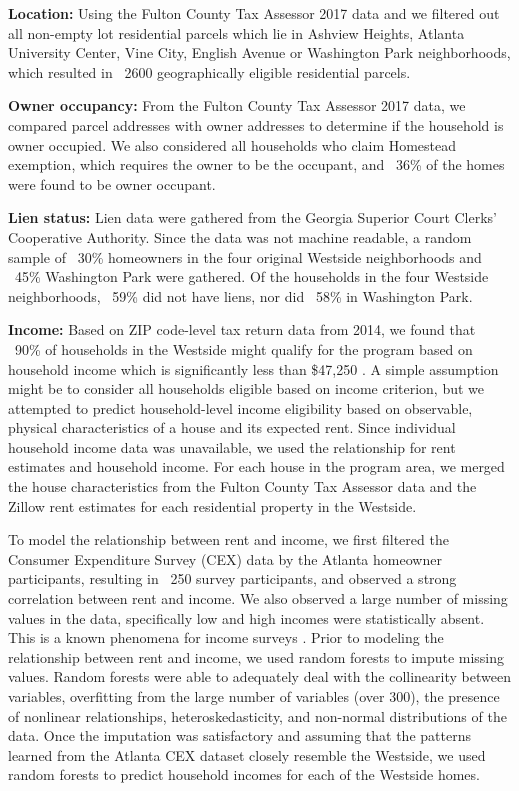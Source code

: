 \documentclass{acm_proc_article-sp}
\begin{document}
{\bf Location:} Using the Fulton County Tax Assessor 2017 data and we filtered out all non-empty lot residential parcels which lie in Ashview Heights, Atlanta University Center, Vine City, English Avenue or Washington Park neighborhoods, which resulted in ~2600 geographically eligible residential parcels.

{\bf Owner occupancy:} From the Fulton County Tax Assessor 2017 data, we compared parcel addresses with owner addresses to determine if the household is owner occupied. We also considered all households who claim Homestead exemption, which requires the owner to be the occupant, and ~36\% of the homes were found to be owner occupant.

{\bf Lien status:} Lien data were gathered from the Georgia Superior Court Clerks' Cooperative Authority. Since the data was not machine readable, a random sample of ~30\% homeowners in the four original Westside neighborhoods and ~45\% Washington Park were gathered. Of the households in the four Westside neighborhoods, ~59\% did not have liens, nor did ~58\% in Washington Park.

{\bf Income:} Based on ZIP code-level tax return data from 2014, we found that ~90\% of households in the Westside might qualify for the program based on household income which is significantly less than \$47,250 \cite{irs14}. A simple assumption might be to consider all households eligible based on income criterion, but we attempted to predict household-level income eligibility based on observable, physical characteristics of a house and its expected rent. Since individual household income data was unavailable, we used the relationship for rent estimates and household income. For each house in the program area, we merged the house characteristics from the Fulton County Tax Assessor data and the Zillow rent estimates for each residential property in the Westside.

To model the relationship between rent and income, we first filtered the Consumer Expenditure Survey (CEX) data by the Atlanta homeowner participants, resulting in ~250 survey participants, and observed a strong correlation between rent and income. We also observed a large number of missing values in the data, specifically low and high incomes were statistically absent. This is a known phenomena for income surveys \cite{groves98}. Prior to modeling the relationship between rent and income, we used random forests to impute missing values. Random forests were able to adequately deal with the collinearity between variables, overfitting from the large number of variables (over 300), the presence of nonlinear relationships, heteroskedasticity, and non-normal distributions of the data. Once the imputation was satisfactory and assuming that the patterns learned from the Atlanta CEX dataset closely resemble the Westside, we used random forests to predict household incomes for each of the Westside homes.
\end{document}
